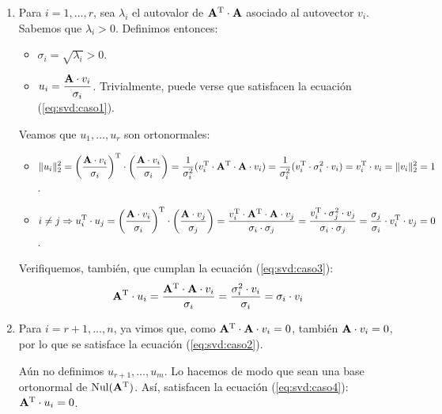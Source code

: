 \begin{enumerate}[label=(\roman*)]
\item Para $i = 1, \dots, r$, sea $\lambda_i$ el autovalor de $\mathbf{A}^{\mathrm{T}}
    \cdot \mathbf{A}$ asociado al autovector $v_i$. Sabemos que $\lambda_i > 0$.
    Definimos entonces:
    \begin{itemize}
    \item $\sigma_i = \sqrt{\lambda_i} > 0$.
    \item $\displaystyle u_i = \frac{\mathbf{A} \cdot v_i}{\sigma_i}$.
        Trivialmente, puede verse que satisfacen la ecuación
        (\ref{eq:svd:caso1}).
    \end{itemize}

    Veamos que $u_1, \dots, u_r$ son ortonormales:
    \begin{itemize}
    \item $\displaystyle \lVert u_i \rVert_2^2
        = \left( \frac{\mathbf{A} \cdot v_i}{\sigma_i} \right)^{\mathrm{T}} \cdot
          \left( \frac{\mathbf{A} \cdot v_i}{\sigma_i} \right)
        = \frac{1}{\sigma_i^2} (v_i^{\mathrm{T}} \cdot \mathbf{A}^{\mathrm{T}}
          \cdot \mathbf{A} \cdot v_i)
        = \frac{1}{\sigma_i^2} (v_i^{\mathrm{T}} \cdot \sigma_i^2 \cdot v_i)
        = v_i^{\mathrm{T}} \cdot v_i
        = \lVert v_i \rVert_2^2
        = 1$.
    \item $\displaystyle i \neq j \Rightarrow u_i^{\mathrm{T}} \cdot u_j
        = \left( \frac{\mathbf{A} \cdot v_i}{\sigma_i} \right)^{\mathrm{T}} \cdot
          \left( \frac{\mathbf{A} \cdot v_j}{\sigma_j} \right)
        = \frac{v_i^{\mathrm{T}} \cdot \mathbf{A}^{\mathrm{T}} \cdot \mathbf{A} \cdot v_j}
          {\sigma_i \cdot \sigma_j}
        = \frac{v_i^{\mathrm{T}} \cdot \sigma_j^2 \cdot v_j}
          {\sigma_i \cdot \sigma_j}
        = \frac{\sigma_j}{\sigma_i} \cdot v_i^{\mathrm{T}} \cdot v_j
        = 0$.
    \end{itemize}

    Verifiquemos, también, que cumplan la ecuación (\ref{eq:svd:caso3}):
    \[ \mathbf{A}^{\mathrm{T}} \cdot u_i
        = \frac{\mathbf{A}^{\mathrm{T}} \cdot \mathbf{A} \cdot v_i}{\sigma_i}
        = \frac{\sigma_i^2 \cdot v_i}{\sigma_i}
        = \sigma_i \cdot v_i \]

\item Para $i = r+1, \dots, n$, ya vimos que, como $\mathbf{A}^{\mathrm{T}} \cdot
    \mathbf{A} \cdot v_i = 0$, también $\mathbf{A} \cdot v_i = 0$, por lo que
    se satisface la ecuación (\ref{eq:svd:caso2}).

    Aún no definimos $u_{r+1}, \dots, u_m$. Lo hacemos de modo que sean una
    base ortonormal de $\operatorname{Nul}(\mathbf{A}^{\mathrm{T}})$. Así, satisfacen la ecuación
    (\ref{eq:svd:caso4}): $\mathbf{A}^{\mathrm{T}} \cdot u_i = 0$.


\end{enumerate}
